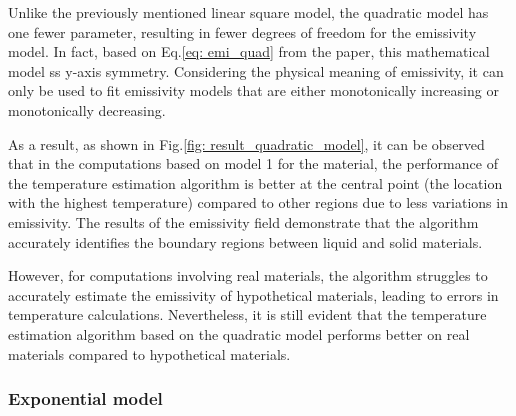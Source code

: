 Unlike the previously mentioned linear square model, the quadratic model has one 
fewer parameter, resulting in fewer degrees of freedom for the emissivity model. 
In fact, based on Eq.\ref{eq: emi_quad} from the paper, this mathematical 
model ss y-axis symmetry. Considering the physical meaning of emissivity, 
it can only be used to fit emissivity models that are either monotonically 
increasing or monotonically decreasing.

As a result, as shown in Fig.\ref{fig: result_quadratic_model}, it can be observed 
that in the computations based on model 1 for the material, the performance 
of the temperature estimation algorithm is better at the central point 
(the location with the highest temperature) compared to other regions due to less 
variations in emissivity.
The results of the emissivity field demonstrate that the algorithm accurately 
identifies the boundary regions between liquid and solid materials.

However, for computations involving real materials, the algorithm struggles to 
accurately estimate the emissivity of hypothetical materials, leading to errors in 
temperature calculations. Nevertheless, it is still evident that the 
temperature estimation algorithm based on the quadratic model performs better 
on real materials compared to hypothetical materials.

\subsubsection{Exponential model}

